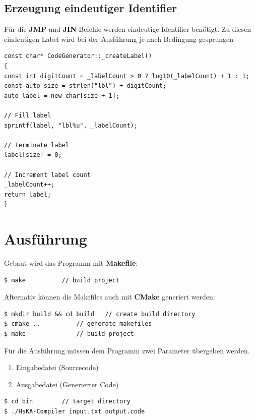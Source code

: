 \documentclass[
	a4paper
]{scrreprt}
\begin{document}
\subsection{Erzeugung eindeutiger Identifier}
Für die \textbf{JMP} und \textbf{JIN} Befehle werden eindeutige Identifier benötigt. Zu diesen eindeutigen Label wird bei der Ausführung je nach Bedingung gesprungen
\begin{lstlisting}
const char* CodeGenerator::_createLabel()
{
const int digitCount = _labelCount > 0 ? log10(_labelCount) + 1 : 1;
const auto size = strlen("lbl") + digitCount;
auto label = new char[size + 1];

// Fill label
sprintf(label, "lbl%u", _labelCount);

// Terminate label
label[size] = 0;

// Increment label count
_labelCount++;
return label;
}
\end{lstlisting}

\section{Ausführung}
Gebaut wird das Programm mit \textbf{Makefile}:
\begin{lstlisting}
$ make 			// build project
\end{lstlisting}

Alternativ können die Makefiles auch mit \textbf{CMake} generiert werden:
\begin{lstlisting}
$ mkdir build && cd build 	// create build directory
$ cmake ..			// generate makefiles
$ make				// build project
\end{lstlisting}

Für die Ausführung müssen dem Programm zwei Parameter übergeben werden.

\begin{enumerate}
	\item Eingabedatei (Sourcecode)
	\item Ausgabedatei (Generierter Code)
\end{enumerate}

\begin{lstlisting}
$ cd bin		// target directory
$ ./HsKA-Compiler input.txt output.code
\end{lstlisting}
\end{document}
